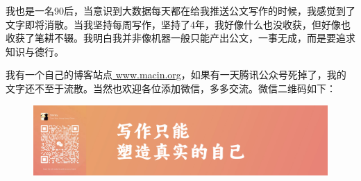 \documentclass[fontset=fandol,12pt,a5paper]{ctexbook}
\begin{document}
我也是一名90后，当意识到大数据每天都在给我推送公文写作的时候，我感觉到了文字即将消散。当我坚持每周写作，坚持了4年，我好像什么也没收获，但好像也收获了笔耕不辍。我明白我并非像机器一般只能产出公文，一事无成，而是要追求知识与德行。

我有一个自己的博客站点\href{https://www.macin.org/}{ www.macin.org}，如果有一天腾讯公众号死掉了，我的文字还不至于流散。当然也欢迎各位添加微信，多多交流。微信二维码如下：

\begin{figure}[htbp] %
\centering %
\includegraphics[width=1\textwidth]{wechat.jpg} %
\end{figure}
\end{document}
